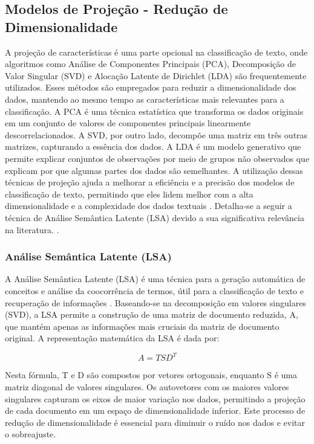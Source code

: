 \subsection{Modelos de Projeção - Redução de Dimensionalidade}

A projeção de características é uma parte opcional na classificação de texto, onde algoritmos como Análise de Componentes Principais (PCA), Decomposição de Valor Singular (SVD) e Alocação Latente de Dirichlet (LDA) são frequentemente utilizados. Esses métodos são empregados para reduzir a dimensionalidade dos dados, mantendo ao mesmo tempo as características mais relevantes para a classificação. A PCA é uma técnica estatística que transforma os dados originais em um conjunto de valores de componentes principais linearmente descorrelacionados. A SVD, por outro lado, decompõe uma matriz em três outras matrizes, capturando a essência dos dados. A LDA é um modelo generativo que permite explicar conjuntos de observações por meio de grupos não observados que explicam por que algumas partes dos dados são semelhantes. A utilização dessas técnicas de projeção ajuda a melhorar a eficiência e a precisão dos modelos de classificação de texto, permitindo que eles lidem melhor com a alta dimensionalidade e a complexidade dos dados textuais \cite{mironczuk2018recent}.   Detalha-se a seguir a técnica de Análise Semântica Latente (LSA) devido a sua significativa relevância na literatura.  \cite{pu2006short}.

\subsubsection{Análise Semântica Latente (LSA)}

A Análise Semântica Latente (LSA) é uma técnica para a geração automática de conceitos e análise da coocorrência de termos, útil para a classificação de texto e recuperação de informações \cite{pu2006short}. Baseando-se na decomposição em valores singulares (SVD), a LSA permite a construção de uma matriz de documento reduzida, A, que mantém apenas as informações mais cruciais da matriz de documento original. A representação matemática da LSA é dada por:

\begin{equation}
    A = TSD^T
\end{equation}

Nesta fórmula, T e D são compostos por vetores ortogonais, enquanto S é uma matriz diagonal de valores singulares. Os autovetores com os maiores valores singulares capturam os eixos de maior variação nos dados, permitindo a projeção de cada documento em um espaço de dimensionalidade inferior. Este processo de redução de dimensionalidade é essencial para diminuir o ruído nos dados e evitar o sobreajuste.

